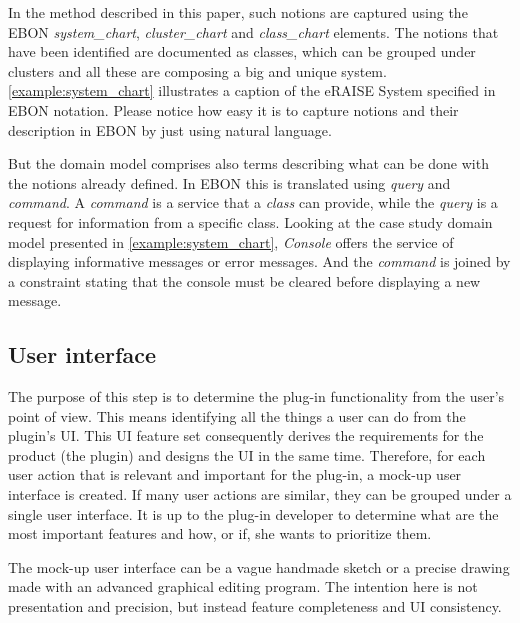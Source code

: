 \documentclass[conference]{IEEEtran}
\newcommand{\note}[1]{\todo[inline,color=red!40]{#1}}
\begin{document}



In the method described in this paper, such notions are captured using
the EBON \emph{system\_chart}, \emph{cluster\_chart} and
\emph{class\_chart} elements. The notions that have been identified
are documented as classes, which can be grouped under clusters and all
these are composing a big and unique system.
\autoref{example:system_chart} illustrates a caption of the eRAISE
System specified in EBON notation. Please notice how easy it is to
capture notions and their description in EBON by just using natural
language.

But the domain model comprises also terms describing what can be
done with the notions already defined. In EBON this is
translated using \emph{query} and \emph{command}. A
\emph{command} is a service that a \emph{class} can provide,
while the \emph{query} is a request for information from a
specific class. Looking at the case study domain model presented
in \autoref{example:system_chart}, \emph{Console} offers the
service of displaying informative messages or error messages.
And the \emph{command} is joined by a constraint stating that
the console must be cleared before displaying a new message.

%
\subsection{User interface}
\label{sec:user-interface}

The purpose of this step is to determine the plug-in functionality
from the user's point of view. This means identifying all the things a
user can do from the plugin's UI. This UI feature set consequently
derives the requirements for the product (the plugin) and designs the
UI in the same time. Therefore, for each user action that is relevant
and important for the plug-in, a mock-up user interface is created. If
many user actions are similar, they can be grouped under a single user
interface. It is up to the plug-in developer to determine what are the
most important features and how, or if, she wants to prioritize them.

The mock-up user interface can be a vague handmade sketch or a
precise drawing made with an advanced graphical editing program.  The
intention here is not presentation and precision, but instead feature
completeness and UI consistency.
\end{document}
